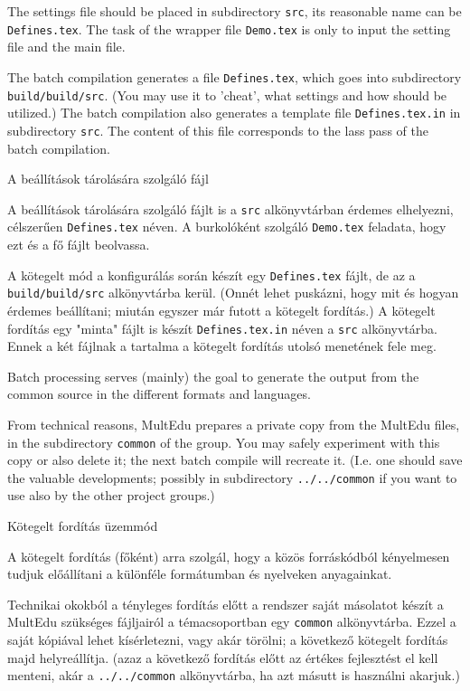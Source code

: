 {
The settings file should be placed in subdirectory \lstinline|src|, its reasonable name can be
\lstinline|Defines.tex|. The task of the wrapper file \lstinline|Demo.tex| is only to input
the setting file and the main file.

The batch compilation generates a file \lstinline|Defines.tex|, which goes into subdirectory
\lstinline|build/build/src|. (You may use it to 'cheat', what settings and how should be utilized.)
The batch compilation also generates a template file \lstinline|Defines.tex.in| in subdirectory \lstinline|src|.
The content of this file corresponds to the lass pass of the batch compilation.
}
{A beállítások tárolására szolgáló fájl}
{
A beállítások tárolására szolgáló fájlt is a \lstinline|src| alkönyvtárban érdemes elhelyezni,
célszerűen \lstinline|Defines.tex| néven. A burkolóként szolgáló \lstinline|Demo.tex| feladata, hogy
ezt és a fő fájlt beolvassa.

A kötegelt mód a konfigurálás során készít egy \lstinline|Defines.tex| fájlt, de az a \lstinline|build/build/src|
alkönyvtárba kerül. (Onnét lehet puskázni, hogy mit és hogyan érdemes beállítani; miután egyszer már futott
a kötegelt fordítás.) A kötegelt fordítás egy "minta" fájlt is készít \lstinline|Defines.tex.in| néven a
\lstinline|src| alkönyvtárba. Ennek a két fájlnak a tartalma a kötegelt fordítás utolsó menetének fele meg.
}


{
Batch processing serves (mainly) the goal to generate the output
from the common source in the different formats and languages.

From technical reasons, MultEdu prepares a private copy from
the MultEdu files, in the subdirectory \lstinline|common|  of the group.
You may safely experiment with this copy or also delete it; the next
batch compile will recreate it. (I.e. one should save the valuable developments; possibly in subdirectory \lstinline|../../common|
if you want to use also by the other project groups.)
}
{Kötegelt fordítás üzemmód}
{
A kötegelt fordítás (főként) arra szolgál, hogy a közös forráskódból kényelmesen tudjuk
előállítani a különféle formátumban és nyelveken anyagainkat.

Technikai okokból a tényleges fordítás előtt a rendszer saját másolatot
készít a MultEdu szükséges fájljairól a témacsoportban egy \lstinline|common| alkönyvtárba.
Ezzel a saját kópiával lehet kísérletezni, vagy akár törölni;
a következő kötegelt fordítás majd helyreállítja. (azaz a következő fordítás előtt az értékes fejlesztést el kell menteni, akár a \lstinline|../../common| alkönyvtárba, ha azt másutt is használni akarjuk.)
}

